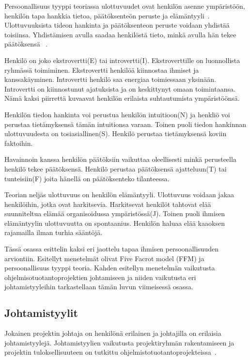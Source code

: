\documentclass[finnish]{tktltiki2}
\theoremstyle{definition}
\theoremstyle{remark}
\begin{document}
Persoonallisuus tyyppi teoriassa ulottuvuudet ovat henkilön asenne ympäristöön, henkilön tapa hankkia tietoa, päätöksenteön peruste ja elämäntyyli~\cite{bradley1997effect}. Ulottuvuuksista tideon hankinta ja päätöksenteon peruste voidaan yhdistää toisiinsa. Yhdistämisen avulla saadaa henkilöstä tieto, minkä avulla hän tekee päätöksensä ~\cite{bradley1997effect}. 
   
Henkilö on joko ekstrovertti(E) tai introvertti(I). Ekstroverttille on luonnollista ryhmässä toimiminen. Ekstrovertti henkilöä kiinnostaa ihmiset ja kanssakäyminen. Introvertti henkilö saa energiaa toimiessaan yksinään. Introvertti on kiinnostunut ajatuksista ja on keskittynyt omaan toimintaansa. Nämä kaksi piirrettä kuvaavat henkilön erilaista suhtautumista ympäristöönsä.

Henkilön tiedon hankinta voi perustua henkilön intuitioon(N) ja henkliö voi perustaa tietämyksensä tämän intuitionsa varaan. Toinen puoli tiedon hankinnan ulottuvuudesta on tosiasiallinen(S). Henkilö perustaa tietämyksensä koviin faktoihin.

Havainnoin kanssa henkilön päätöksiin vaikuttaa oleellisesti minkä perusteella henkilö tekee päätöksensä. Henkilö perustaa päätöksensä ajatteluun(T) tai tunteisiin(F) joita hänellä on päätöksenteko tilanteessa.

Teorian neljäs ulottuvuus on henkilön elämäntyyli. Ulottuvuus voidaan jakaa henkilöihin, jotka ovat harkitsevia. Harkitsevat henkilöt tahtovat elää suunniteltua elämää organisoidussa ympäristössä(J). Toinen puoli ihmisen elämäntyylin ulottuvuutta on spontaanius. Henkilön haluaa elää kaaoksen rajamailla ilman turhia sääntöjä.

Tässä osassa esittelin kaksi eri jaottelu tapaa ihmisen persoonallisuuden arviontiin. Esitellyt menetelmät olivat Five Facrot model (FFM) ja persoonallisuus tyyppi teoria. Kahden esitellyn menetelmän vaikutusta ohjelmisotuotantoprojektien johtamiseen ja niiden vaikutusta eri johtamistyyleihin tarkastellaan tämän luvun viimeisessä osassa.   

\subsection{Johtamistyylit}

Jokainen projektin johtaja on henkilönä erilainen ja johtajilla on erilaisia johtamistyylejä. Johtamistyylien vaikutusta projektiryhmän rakentamiseen ja projektin tuloksellisuuteen on tutkittu ohjelmistotuotantoprojekteissa~\cite{Dhomne:2012:ITL:2382887.2382899}. 
\end{document}
